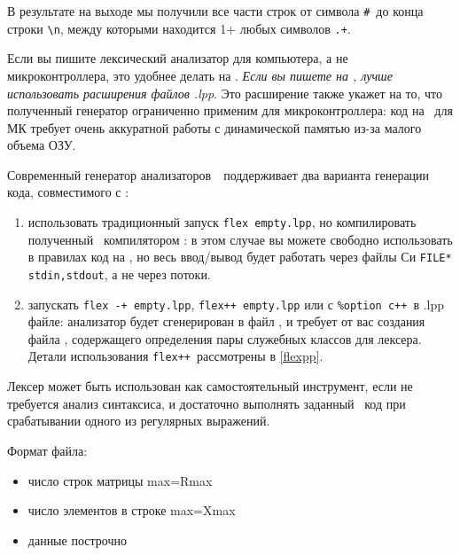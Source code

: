 В результате на выходе мы получили все части строк от символа \verb|#|\ до
конца строки \verb|\n|, между которыми находится 1+ любых символов \verb|.+|.


Если вы пишите лексический анализатор для компьютера, а не микроконтроллера,
это удобнее делать на \cpp. 
\emph{Если вы пишете на \cpp, лучше использовать расширения файлов .lpp}.
Это расширение также укажет на то, что полученный генератор ограниченно
применим для микроконтроллера: код на \cpp\ для МК требует очень аккуратной
работы с динамической памятью из-за малого объема ОЗУ. 

Современный генератор анализаторов\
\ поддерживает два варианта генерации кода, совместимого с \cpp:

\begin{enumerate}
\item использовать традиционный запуск \verb|flex empty.lpp|, но компилировать
полученный \file{lex.yy.c}\ компилятором \prog{g++}: в этом случае вы можете
свободно использовать в правилах код на \cpp, но весь ввод/вывод будет работать
через файлы Си \verb|FILE* stdin,stdout|, а не через потоки. 


\item запускать \verb|flex -+ empty.lpp|, \verb|flex++ empty.lpp|
или с \verb|%option c++|\ в .lpp файле: анализатор будет сгенерирован в файл
\file{lex.yy.cc}, и требует от вас создания файла \file{FlexLexer.h},
содержащего определения пары служебных классов для лексера. Детали
использования \verb|flex++|\ рассмотрены в \ref{flexpp}. 

\end{enumerate}  

\secup



\secdown

\begin{framed}
\noindent Лексер может быть использован как самостоятельный инструмент, если
не требуется анализ синтаксиса, и достаточно выполнять заданный \cpp\ код
при срабатывании одного из регулярных выражений.
\end{framed}


Формат файла: \bigskip

\begin{itemize}[nosep]
\item число строк матрицы max=Rmax
\item число элементов в строке max=Xmax
\item данные построчно
\end{itemize}

